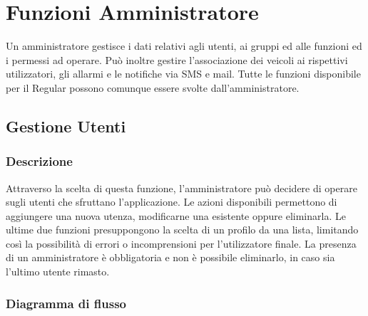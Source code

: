 \documentclass[a4paper,12pt]{article}
\begin{document}
\pagebreak

\section{Funzioni Amministratore}
Un amministratore gestisce i dati relativi agli utenti, ai gruppi ed alle funzioni ed i permessi ad operare. Può inoltre gestire l'associazione dei veicoli ai rispettivi utilizzatori, gli allarmi e le notifiche via SMS e mail. Tutte le funzioni disponibile per il Regular possono comunque essere svolte dall'amministratore.
\begin{center}
\end{center}

\subsection{Gestione Utenti}
\subsubsection{Descrizione}
Attraverso la scelta di questa funzione, l'amministratore può decidere di operare sugli utenti che sfruttano l'applicazione. Le azioni disponibili permettono di aggiungere una nuova utenza, modificarne una esistente oppure eliminarla. Le ultime due funzioni presuppongono la scelta di un profilo da una lista, limitando così la possibilità di errori o incomprensioni per l'utilizzatore finale. La presenza di un amministratore è obbligatoria e non è possibile eliminarlo, in caso sia l'ultimo utente rimasto.
\subsubsection{Diagramma di flusso}
\end{document}
